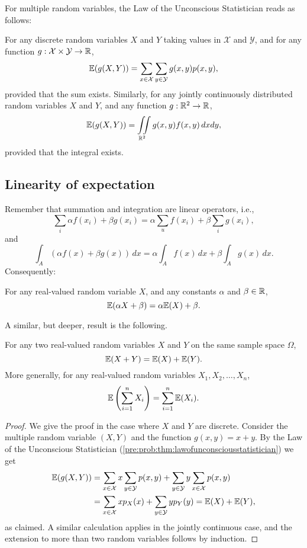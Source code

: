 \documentclass[10pt, a4paper]{article}
\begin{document}
For multiple random variables,
the Law of the Unconscious Statistician reads as follows:
\begin{theorem}\label{pre:prob:thm:multilawofunconsciousstatistician}
    For any discrete random variables $X$ and $Y$ taking values in $\mathcal{X}$ and $\mathcal{Y}$,
    and for any function $g : \mathcal{X} \times \mathcal{Y} \rightarrow \mathbb{R}$,
    \[
    \mathbb{E}(g(X, Y)) = \sum_{x \in \mathcal{X}}\sum_{y \in \mathcal{Y}}g(x, y)p(x, y),
    \]
    provided that the sum exists.
    Similarly,
    for any jointly continuously distributed random variables $X$ and $Y$,
    and any function $g : \mathbb{R} ^ 2 \rightarrow \mathbb{R}$,
    \[
    \mathbb{E}(g(X, Y)) = \iint\limits_{\mathbb{R} ^ 2}g(x, y)f(x, y)\,dxdy,
    \]
    provided that the integral exists.
\end{theorem}

\subsection{Linearity of expectation}
Remember that summation and integration are linear operators,
i.e.,
\[
\sum_{i}\alpha f(x_i) + \beta g(x_i) = \alpha\sum_{u}f(x_i) + \beta\sum_{i}g(x_i),
\]
and
\[
\int_A(\alpha f(x) + \beta g(x))\,dx = \alpha\int_Af(x)\,dx + \beta\int_Ag(x)\,dx.
\]
Consequently:
\begin{theorem}
    For any real-valued random variable $X$,
    and any constants $\alpha$ and $\beta \in \mathbb{R}$,
    \[
    \mathbb{E}(\alpha X + \beta) = \alpha\mathbb{E}(X) + \beta.
    \]
\end{theorem}
A similar,
but deeper,
result is the following.
\begin{theorem}
    For any two real-valued random variables $X$ and $Y$ on the same sample space $\Omega$,
    \[
    \mathbb{E}(X + Y) = \mathbb{E}(X) + \mathbb{E}(Y).
    \]
    More generally,
    for any real-valued random variables $X_1, X_2, \dotsc, X_n$,
    \[
    \mathbb{E}\left(\sum_{i = 1}^{n}X_i\right) = \sum_{i = 1}^{n}\mathbb{E}(X_i).
    \]
    \begin{proof}
        We give the proof in the case where $X$ and $Y$ are discrete.
        Consider the multiple random variable $(X, Y)$ and the function $g(x, y) = x + y$.
        By the Law of the Unconscious Statistician
        (\autoref{pre:prob:thm:lawofunconsciousstatistician})
        we get
        \begin{align*}
            \mathbb{E}(g(X, Y)) &= \sum_{x \in \mathcal{X}}x\sum_{y \in \mathcal{Y}}p(x, y) + \sum_{y \in \mathcal{Y}}y\sum_{x \in \mathcal{X}}p(x, y) \\
            &= \sum_{x \in \mathcal{X}}xp_X(x) + \sum_{y \in \mathcal{Y}}yp_Y(y) = \mathbb{E}(X) + \mathbb{E}(Y),
        \end{align*}
        as claimed.
        A similar calculation applies in the jointly continuous case,
        and the extension to more than two random variables follows by induction.
    \end{proof}
\end{theorem}
\end{document}
